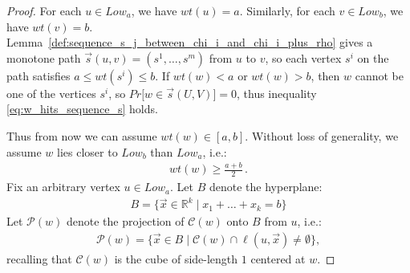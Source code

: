 \documentclass[11pt]{article}
\begin{document}
\begin{proof} 
    For each $u \in Low_a$, we have $wt(u) = a$. Similarly, for each $v \in Low_b$, we have $wt(v) = b$. Lemma~\ref{def:sequence_s_j_between_chi_i_and_chi_i_plus_rho} gives a  monotone path  $\vec{s}(u,v) = (s^1, \ldots, s^m)$ from $u$ to $v$, so each vertex $s^i$ on the path  satisfies $a \leq wt(s^i) \leq b$. 
    If $wt(w) < a$ or $wt(w) > b$, then $w$ cannot be one of the vertices $s^i$, so $Pr\bigl[w \in \vec{s}(U,V) \bigr] = 0$, thus inequality \eqref{eq:w_hits_sequence_s} holds.

    Thus from now we can assume  $wt(w) \in [a, b]$.
   Without loss of generality, we assume $w$ lies closer to $Low_b$ than $Low_a$, i.e.:
    \begin{align}\label{eq:wt-w-ge-a-plus-b-over-2}
        wt(w) \geq \frac{a+b}{2}\,.
    \end{align}
    Fix an arbitrary vertex ${u} \in Low_a$. Let $B$ denote the hyperplane:
    \begin{align}
        B = \{\vec{x} \in \mathbb{R}^k \mid x_1 + \ldots + x_k = b\}
    \end{align}
   Let $\mathcal{P}(w)$ denote the projection of $\mathcal{C}(w)$ onto $B$ from $u$, i.e.:
    \begin{align}
        \mathcal{P}(w) = \{ \vec{x} \in B \mid \mathcal{C}(w) \cap \ell(u, \vec{x}) \neq \emptyset \},
    \end{align}
  recalling that $\mathcal{C}(w)$ is the cube of side-length $1$ centered at $w$. 
  

\end{proof}
\end{document}
